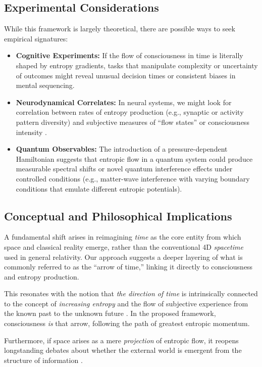 \documentclass[12pt]{article}
\begin{document}
\subsection{Experimental Considerations}
While this framework is largely theoretical, there are possible ways to seek empirical signatures:

\begin{itemize}
    \item \textbf{Cognitive Experiments:} If the flow of consciousness in time is literally shaped by entropy gradients, tasks that manipulate complexity or uncertainty of outcomes might reveal unusual decision times or consistent biases in mental sequencing. 
    \item \textbf{Neurodynamical Correlates:} In neural systems, we might look for correlation between rates of entropy production (e.g., synaptic or activity pattern diversity) and subjective measures of ``flow states'' or consciousness intensity \cite{flow1990csikszentmihalyi}.
    \item \textbf{Quantum Observables:} The introduction of a pressure-dependent Hamiltonian suggests that entropic flow in a quantum system could produce measurable spectral shifts or novel quantum interference effects under controlled conditions (e.g., matter-wave interference with varying boundary conditions that emulate different entropic potentials).
\end{itemize}

\subsection{Conceptual and Philosophical Implications}
A fundamental shift arises in reimagining \emph{time} as the core entity from which space and classical reality emerge, rather than the conventional 4D \emph{spacetime} used in general relativity. Our approach suggests a deeper layering of what is commonly referred to as the ``arrow of time,'' linking it directly to consciousness and entropy production.

This resonates with the notion that \emph{the direction of time} is intrinsically connected to the concept of \emph{increasing entropy} and the flow of subjective experience from the known past to the unknown future \cite{zeh2007physical}. In the proposed framework, consciousness \emph{is} that arrow, following the path of greatest entropic momentum.

Furthermore, if space arises as a mere \emph{projection} of entropic flow, it reopens longstanding debates about whether the external world is emergent from the structure of information \cite{wheeler1989information}.
\end{document}
